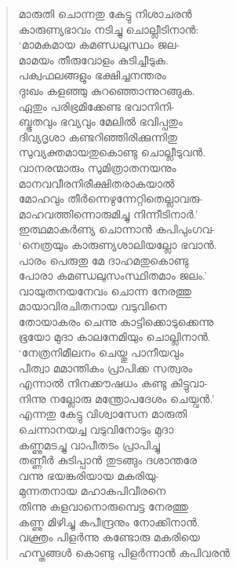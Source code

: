 \begin{verse}
മാരുതി ചൊന്നതു കേട്ടു നിശാചരന്‍\\
കാരുണ്യഭാവം നടിച്ചു ചൊല്ലീടിനാന്‍:\\
‘മാമകമായ കമണ്ഡലുസ്ഥം ജല-\\
മാമയം തീരുവോളം കുടിച്ചീടുക.\\
പക്വഫലങ്ങളും ഭക്ഷിച്ചനന്തരം\\
ദുഃഖം കളഞ്ഞു കുറഞ്ഞൊന്നുറങ്ങുക.\\
ഏതും പരിഭ്രമിക്കേണ്ട ഭവാനിനി-\\
ബ്ഭൂതവും ഭവ്യവും മേലില്‍ ഭവിപ്പതും\\
ദിവ്യദൃശാ കണ്ടറിഞ്ഞിരിക്കുന്നിതു\\
സുവ്യക്തമായതുകൊണ്ടു ചൊല്ലീടുവന്‍.\\
വാനരന്മാരും സുമിത്രാതനയനും\\
മാനവവീരനിരീക്ഷിതരാകയാല്‍\\
മോഹവും തീര്‍ന്നെഴുന്നേറ്റിതെല്ലാവരു-\\
മാഹവത്തിന്നൊരുമിച്ചു നിന്നീടിനാര്‍.’\\
ഇത്ഥമാകര്‍ണ്യ ചൊന്നാന്‍ കപിപുംഗവ-\\
‘നെത്രയും കാരുണ്യശാലിയല്ലോ ഭവാന്‍.\\
പാരം പെരുതു മേ ദാഹമതുകൊണ്ടു\\
പോരാ കമണ്ഡലുസംസ്ഥിതമാം ജലം.’\\
വായുതനയനേവം ചൊന്ന നേരത്തു\\
മായാവിരചിതനായ വടുവിനെ\\
തോയാകരം ചെന്നു കാട്ടിക്കൊടുക്കെന്നു\\
ഭൂയോ മുദാ കാലനേമിയും ചൊല്ലിനാന്‍.\\
‘നേത്രനിമീലനം ചെയ്തു പാനീയവും\\
പീത്വാ മമാന്തികം പ്രാപിക്ക സത്വരം\\
എന്നാല്‍ നിനക്കൗഷധം കണ്ടു കിട്ടുവാ-\\
നിന്നു നല്ലോരു മന്ത്രോപദേശം ചെയ്വന്‍.’\\
എന്നതു കേട്ടു വിശ്വാസേന മാരുതി\\
ചെന്നാനയച്ച വടുവിനോടും മുദാ\\
കണ്ണുമടച്ചു വാപീതടം പ്രാപിച്ചു\\
തണ്ണീര്‍ കുടിപ്പാന്‍ തുടങ്ങും ദശാന്തരേ\\
വന്നു ഭയങ്കരിയായ മകരിയു-\\
മുന്നതനായ മഹാകപിവീരനെ\\
തിന്നു കളവാനൊരുമ്പെട്ട നേരത്തു\\
കണ്ണു മിഴിച്ചു കപീന്ദ്രനും നോക്കിനാന്‍.\\
വക്ത്രം പിളര്‍ന്നു കണ്ടോരു മകരിയെ\\
ഹസ്തങ്ങള്‍ കൊണ്ടു പിളര്‍ന്നാന്‍ കപിവരന്‍\\

\end{verse}
